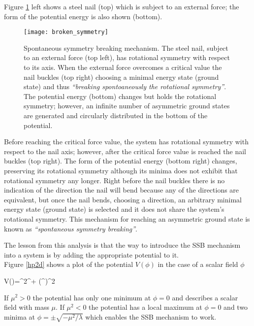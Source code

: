 \noindent Figure \ref{ssb} left shows a steel nail (top) which is subject to an external force; the form of the potential energy is also shown (bottom).\\ 
\begin{figure}[!h]
\centering
\texttt{[image: broken\_symmetry]}
\caption[Spontaneous symmetry breaking mechanism]{Spontaneous symmetry breaking mechanism. The steel nail, subject to an external force (top left), has rotational symmetry with respect to its axis. When the external force overcomes a critical value the nail buckles (top right) choosing a minimal energy state (ground state) and thus \textit{``breaking spontoaneously the rotational symmetry''}. The potential energy (bottom) changes but holds the rotational symmetry; however, an infinite number of asymmetric ground states are generated and circularly distributed in the bottom of the potential\cite{broken_symmetry}.}
\label{ssb}
\end{figure}

\noindent Before reaching the critical force value, the system has rotational symmetry with respect to the nail axis; however, after the critical force value is reached the nail buckles (top right). The form of the potential energy (bottom right) changes, preserving its rotational symmetry although its minima does not exhibit that rotational symmetry any longer. Right before the nail buckles there is no indication of the direction the nail will bend because any of the directions are equivalent, but once the nail bends, choosing a direction, an arbitrary minimal energy state (ground state) is selected and it does not share the system's rotational symmetry. This mechanism for reaching an asymmetric ground state is known as \textit{``spontaneous symmetry breaking''}.       

\noindent The lesson from this analysis is that the way to introduce the SSB mechanism into a system is by adding the appropriate potential to it.\\ 

\noindent Figure \ref{hp2d} shows a plot of the potential $V(\phi)$ in the case of a scalar field $\phi$

\beqn\label{Higgs_potential}
V(\phi)=\mu^2\phi^\dagger\phi + \lambda(\phi^\dagger\phi)^2
\eeqn

\noindent If $\mu^2>0$ the potential has only one minimum at $\phi=0$ and describes a scalar field with mass $\mu$. If $\mu^2<0$ the potential has a local maximum at $\phi=0$ and two minima at $\phi=\pm \sqrt{-\mu^2/\lambda}$ which enables the SSB mechanism to work.\\ 


